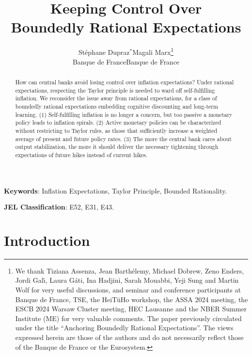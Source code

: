 \documentclass{article}
\title{\textbf{Keeping Control Over\\ Boundedly Rational Expectations}}
\author{\begin{tabular}{cc}
		St\'ephane Dupraz$^{ *}$ & Magali Marx\thanks{We thank Tiziana Assenza, Jean Barth\'elemy, Michael Dobrew, Zeno Enders, Jordi Gal\'{\i}, Laura G\'ati, Ina Hadjini, Sarah Mouabbi, Yeji Sung and Martin Wolf for very useful discussions, and seminar and conference participants at Banque de France, TSE, the HeiT\"uHo workshop, the ASSA 2024 meeting, the ESCB 2024 Warsaw Cluster meeting, HEC Lausanne and the NBER Summer Institute (ME)
		for very valuable comments. The paper previously circulated under the title ``Anchoring Boundedly Rational Expectations''. The views expressed herein are those of the authors and do not necessarily reflect those of the Banque de France or the Eurosystem.} \\
		Banque de France & Banque de France
	    \end{tabular}}
\begin{document}
	\maketitle
{}
\begin{abstract}
How can central banks avoid losing control over inflation expectations? Under rational expectations, respecting the Taylor principle is needed to ward off self-fulfilling inflation. We reconsider the issue away from rational expectations, for a class of boundedly rational expectations embedding cognitive discounting and long-term learning. (1) Self-fulfilling inflation is no longer a concern, but too passive a monetary policy leads to inflation spirals. (2) Active monetary policies can be characterized without restricting to Taylor rules, as those that sufficiently increase a weighted average of present and future policy rates. (3) The more the central bank cares about output stabilization, the more it should deliver the necessary tightening through expectations of future hikes instead of current hikes.
\end{abstract}


\vspace{20pt}
\textbf{Keywords}: Inflation Expectations, Taylor Principle, Bounded Rationality.

\textbf{JEL Classification}: E52, E31, E43.
\vspace{20pt}

\clearpage
{}
\section*{Introduction}
\end{document}
